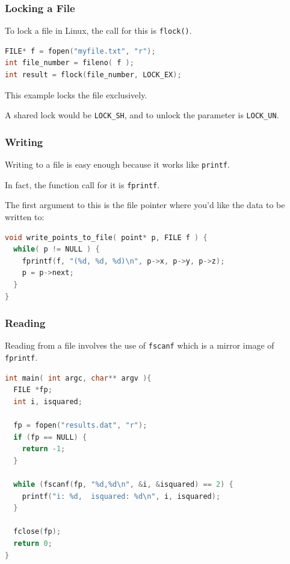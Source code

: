 \begin{frame}[fragile]
\frametitle{Locking a File}
To lock a file in Linux, the call for this is \texttt{flock()}.

\begin{lstlisting}[language=C]
FILE* f = fopen("myfile.txt", "r");
int file_number = fileno( f );
int result = flock(file_number, LOCK_EX);
\end{lstlisting}

This example locks the file exclusively. 

A shared lock would be \texttt{LOCK\_SH}, and to unlock the parameter is \texttt{LOCK\_UN}. 

\end{frame}


\begin{frame}[fragile]
\frametitle{Writing}

Writing to a file is easy enough because it works like \texttt{printf}. 

In fact, the function call for it is \texttt{fprintf}.

The first argument to this is the file pointer where you'd like the data to be written to:

\begin{lstlisting}[language=C]
void write_points_to_file( point* p, FILE f ) {
  while( p != NULL ) {
    fprintf(f, "(%d, %d, %d)\n", p->x, p->y, p->z);
    p = p->next;
  }
}
\end{lstlisting}
\end{frame}


\begin{frame}[fragile]
\frametitle{Reading}

Reading from a file involves the use of \texttt{fscanf} which is a mirror image of \texttt{fprintf}. 


\begin{lstlisting}[language=C]
int main( int argc, char** argv ){
  FILE *fp;
  int i, isquared;
   
  fp = fopen("results.dat", "r");
  if (fp == NULL) {
    return -1;
  }
   
  while (fscanf(fp, "%d,%d\n", &i, &isquared) == 2) {
    printf("i: %d,  isquared: %d\n", i, isquared);
  }
  
  fclose(fp);
  return 0;
}
\end{lstlisting}

\end{frame}



